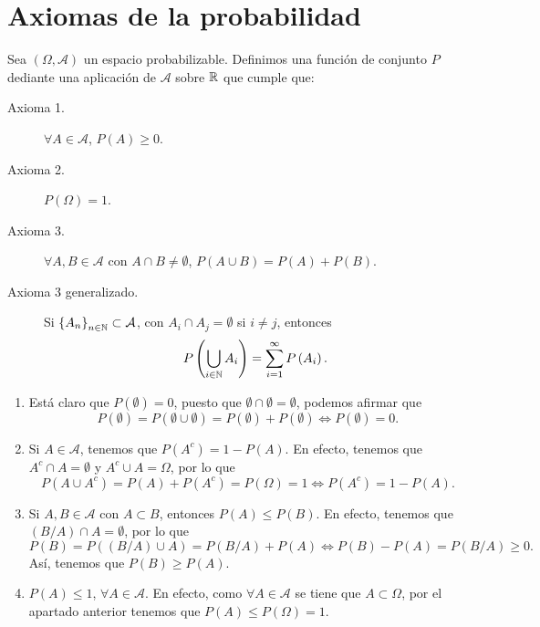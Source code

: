 \section{Axiomas de la probabilidad}
\begin{definition}
Sea $\displaystyle \left(\Omega, \mathcal{A}\right) $ un espacio probabilizable. Definimos una función de conjunto $\displaystyle P $ dediante una aplicación de $\displaystyle \mathcal{A} $ sobre $\displaystyle \mathbb{R} $ que cumple que:
\begin{description}
\item[Axioma 1.] $\displaystyle \forall A \in \mathcal{A} $, $\displaystyle P\left(A\right) \geq 0 $.
\item[Axioma 2.] $\displaystyle P\left(\Omega \right)= 1 $.
\item[Axioma 3.] $\displaystyle \forall A,B \in \mathcal{A} $ con $\displaystyle A \cap B \neq \emptyset $, $\displaystyle P\left(A \cup B\right) = P\left(A\right) + P\left(B\right) $.
\item[Axioma 3 generalizado.] Si $\displaystyle \left\{ A_{n}\right\} _{n\in \mathbb{N}} \subset \mathcal{A} $, con $\displaystyle A_{i} \cap A_{j} = \emptyset $ si $\displaystyle i \neq j $, entonces
	\[P\left(\bigcup_{i \in \mathbb{N}}A_{i}\right) = \sum^{\infty}_{i = 1}P\left(A_{i}\right) .\]
\end{description}
\end{definition}
\begin{observation}
\begin{enumerate}
\item Está claro que $\displaystyle P\left(\emptyset\right) = 0 $, puesto que $\displaystyle \emptyset \cap \emptyset = \emptyset $, podemos afirmar que
	\[P\left(\emptyset\right) = P\left(\emptyset \cup \emptyset\right) = P\left(\emptyset\right) + P\left(\emptyset\right) \iff P\left(\emptyset\right) = 0 .\]
\item Si $\displaystyle A \in \mathcal{A} $, tenemos que $\displaystyle P\left(A^{c}\right) = 1 - P\left(A\right) $. En efecto, tenemos que $\displaystyle A^{c} \cap A = \emptyset $ y $\displaystyle A^{c} \cup A = \Omega  $, por lo que
	\[P\left(A \cup A^{c} \right) = P\left(A\right) + P\left(A^{c}\right) = P\left(\Omega \right) = 1 \iff P\left(A^{c}\right) = 1 - P\left(A\right) .\]
\item Si $\displaystyle A,B \in \mathcal{A} $ con $\displaystyle A \subset B $, entonces $\displaystyle P\left(A\right) \leq P\left(B\right) $. En efecto, tenemos que $\displaystyle \left(B/A\right) \cap A = \emptyset $, por lo que 
	\[P\left(B\right) = P\left(\left(B/A\right) \cup A\right) = P\left(B/A\right) + P\left(A\right) \iff P\left(B\right)-P\left(A\right) = P\left(B/A\right) \geq 0 .\]
	Así, tenemos que $\displaystyle P\left(B\right) \geq P\left(A\right) $.
\item $\displaystyle P\left(A\right) \leq 1 $, $\displaystyle \forall A \in \mathcal{A} $. En efecto, como $\displaystyle \forall A \in \mathcal{A} $ se tiene que $\displaystyle A \subset \Omega  $, por el apartado anterior tenemos que $\displaystyle P\left(A\right) \leq P\left(\Omega \right) = 1 $.
\end{enumerate}
\end{observation}
